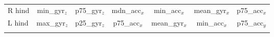 \begin{table}[htb]
{\begin{tabular}[H]{lcccccc}
     \multicolumn{1}{l}{R hind} &  \multicolumn{1}{c}{min\_gyr$_z$} & \multicolumn{1}{c}{p75\_gyr$_z$} & \multicolumn{1}{c}{mdn\_acc$_x$} & \multicolumn{1}{c}{min\_acc$_x$} & \multicolumn{1}{c}{mean\_gyr$_x$} & \multicolumn{1}{c}{p75\_acc$_x$}\\ [0.4 em]
    
     \multicolumn{1}{l}{L hind} &  \multicolumn{1}{c}{max\_gyr$_z$} & \multicolumn{1}{c}{p25\_gyr$_z$} & \multicolumn{1}{c}{p75\_acc$_x$} & \multicolumn{1}{c}{mean\_gyr$_x$} & \multicolumn{1}{c}{min\_acc$_x$} & \multicolumn{1}{c}{p75\_acc$_y$}\\ [0.4 em]
    
        \bottomrule
    \label{tablefeature}
  \end{tabular}}
\end{table}